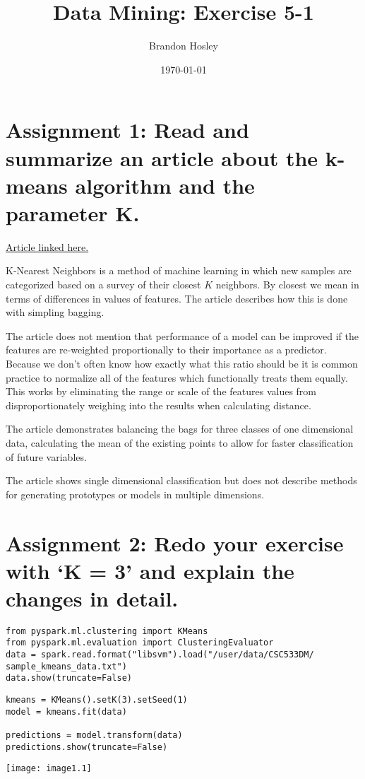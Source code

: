 \documentclass[]{article}
\title{Data Mining: Exercise 5-1}
\author{Brandon Hosley}
\date{\today}
\begin{document}
\maketitle

\section*{Assignment 1: Read and summarize an article about the k-means algorithm and the parameter K.}
\href{https://towardsdatascience.com/how-does-k-means-clustering-in-machine-learning-work-fdaaaf5acfa0}{Article linked here.}

K-Nearest Neighbors is a method of machine learning in which new samples are categorized based on a survey of their closest $K$ neighbors. By closest we mean in terms of differences in values of features. The article describes how this is done with simpling bagging. 

The article does not mention that performance of a model can be improved if the features are re-weighted proportionally to their importance as a predictor. Because we don't often know how exactly what this ratio should be it is common practice to normalize all of the features which functionally treats them equally. This works by eliminating the range or scale of the features values from disproportionately weighing into the results when calculating distance.

The article demonstrates balancing the bags for three classes of one dimensional data, calculating the mean of the existing points to allow for faster classification of future variables.

The article shows single dimensional classification but does not describe methods for generating prototypes or models in multiple dimensions.


\section*{Assignment 2: Redo your exercise with ‘K = 3’ and explain the changes in detail.}

\begin{verbatim}
from pyspark.ml.clustering import KMeans
from pyspark.ml.evaluation import ClusteringEvaluator
data = spark.read.format("libsvm").load("/user/data/CSC533DM/ sample_kmeans_data.txt")
data.show(truncate=False)
\end{verbatim}

\begin{verbatim}
kmeans = KMeans().setK(3).setSeed(1)
model = kmeans.fit(data)

predictions = model.transform(data)
predictions.show(truncate=False)
\end{verbatim}
\texttt{[image: image1.1]}
\end{document}
